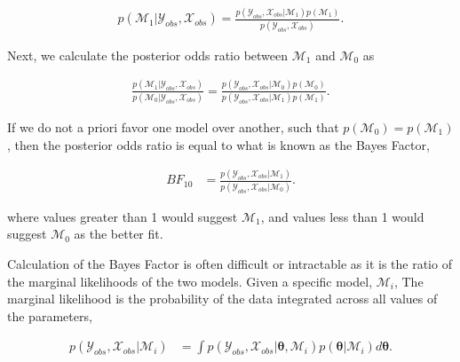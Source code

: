 \documentclass[
  12pt,
]{article}
\begin{document}
\begin{align}
p(\mathcal{M}_1|\mathcal{Y}_{obs},\mathcal{X}_{obs}) = \frac{p(\mathcal{Y}_{obs},\mathcal{X}_{obs}|\mathcal{M}_1)p(\mathcal{M}_1)}{p(\mathcal{Y}_{obs},\mathcal{X}_{obs})}.
\end{align}

\vspace{-20px}

Next, we calculate the posterior odds ratio between \(\mathcal{M}_1\)
and \(\mathcal{M}_0\) as

\vspace{-20px}

\begin{align}
\frac{p(\mathcal{M}_1|\mathcal{Y}_{obs},\mathcal{X}_{obs})}{p(\mathcal{M}_0|\mathcal{Y}_{obs},\mathcal{X}_{obs})} = 
\frac{p(\mathcal{Y}_{obs},\mathcal{X}_{obs}|\mathcal{M}_0)p(\mathcal{M}_0)}{p(\mathcal{Y}_{obs},\mathcal{X}_{obs}|\mathcal{M}_1)p(\mathcal{M}_1)}.
\end{align} \vspace{-20px}

If we do not a priori favor one model over another, such that
\(p(\mathcal{M}_0)=p(\mathcal{M}_1)\), then the posterior odds ratio is
equal to what is known as the Bayes Factor,

\vspace{-20px}

\begin{align}
\label{eqn:bayesfactorformula}
BF_{10} & = \frac{p(\mathcal{Y}_{obs},\mathcal{X}_{obs}|\mathcal{M}_1)}{p(\mathcal{Y}_{obs},\mathcal{X}_{obs}|\mathcal{M}_0)}.
\end{align} \vspace{-20px}

where values greater than 1 would suggest \(\mathcal{M}_1\), and values
less than 1 would suggest \(\mathcal{M}_0\) as the better fit.

Calculation of the Bayes Factor is often difficult or intractable as it
is the ratio of the marginal likelihoods of the two models. Given a
specific model, \(\mathcal{M}_i\), The marginal likelihood is the
probability of the data integrated across all values of the parameters,

\vspace{-20px}

\begin{align}
\label{eqn:marginallikelihoodBF}
p(\mathcal{Y}_{obs},\mathcal{X}_{obs}|\mathcal{M}_i) & = \int p(\mathcal{Y}_{obs},\mathcal{X}_{obs}|\boldsymbol{\theta},\mathcal{M}_i)p(\boldsymbol{\theta}|\mathcal{M}_i) d\boldsymbol{\theta}.
\end{align} \vspace{-20px}
\end{document}
